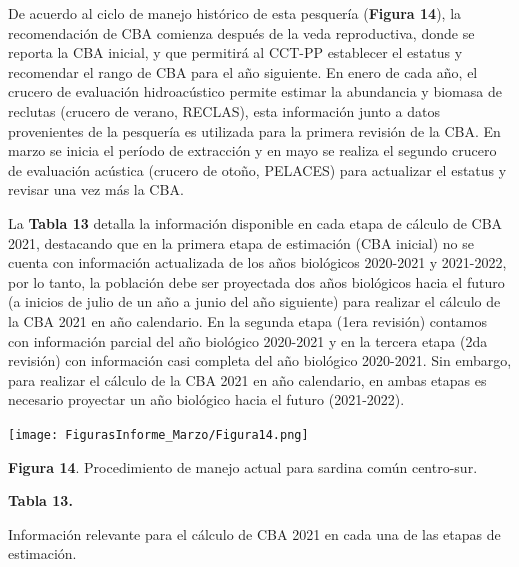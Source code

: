 \documentclass[
  spanish,
]{article}
\begin{document}
De acuerdo al ciclo de manejo histórico de esta pesquería
(\textbf{Figura 14}), la recomendación de CBA comienza después de la
veda reproductiva, donde se reporta la CBA inicial, y que permitirá al
CCT-PP establecer el estatus y recomendar el rango de CBA para el año
siguiente. En enero de cada año, el crucero de evaluación hidroacústico
permite estimar la abundancia y biomasa de reclutas (crucero de verano,
RECLAS), esta información junto a datos provenientes de la pesquería es
utilizada para la primera revisión de la CBA. En marzo se inicia el
período de extracción y en mayo se realiza el segundo crucero de
evaluación acústica (crucero de otoño, PELACES) para actualizar el
estatus y revisar una vez más la CBA.

La \textbf{Tabla 13} detalla la información disponible en cada etapa de
cálculo de CBA 2021, destacando que en la primera etapa de estimación
(CBA inicial) no se cuenta con información actualizada de los años
biológicos 2020-2021 y 2021-2022, por lo tanto, la población debe ser
proyectada dos años biológicos hacia el futuro (a inicios de julio de un
año a junio del año siguiente) para realizar el cálculo de la CBA 2021
en año calendario. En la segunda etapa (1era revisión) contamos con
información parcial del año biológico 2020-2021 y en la tercera etapa
(2da revisión) con información casi completa del año biológico
2020-2021. Sin embargo, para realizar el cálculo de la CBA 2021 en año
calendario, en ambas etapas es necesario proyectar un año biológico
hacia el futuro (2021-2022).

\begin{center}
\texttt{[image: FigurasInforme\_Marzo/Figura14.png]}
\end{center}

\small

\textbf{Figura 14}. Procedimiento de manejo actual para sardina común
centro-sur. \vspace{0.5cm} \normalsize

\small

\begin{center} 
 \textbf{Tabla 13.}
 \end{center}
 \begin{center} 
 \vspace{-0.2cm} Información relevante para el cálculo de CBA 2021 en cada una de las etapas de estimación.
 \end{center}
 \vspace{-0.2cm}
\end{document}
